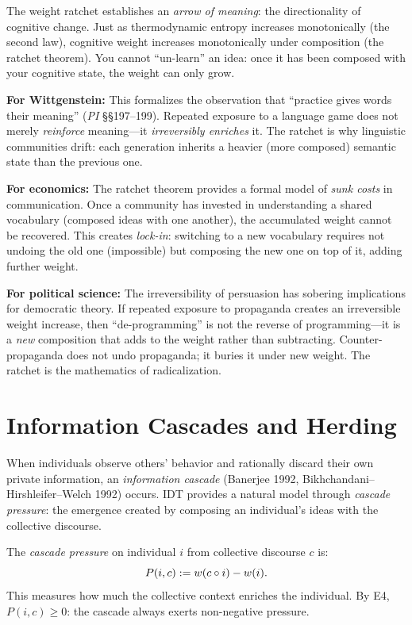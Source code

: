 \begin{interpretation}
The weight ratchet establishes an \emph{arrow of meaning}: the
directionality of cognitive change. Just as thermodynamic entropy
increases monotonically (the second law), cognitive weight increases
monotonically under composition (the ratchet theorem). You cannot
``un-learn'' an idea: once it has been composed with your cognitive
state, the weight can only grow.

\textbf{For Wittgenstein:} This formalizes the observation that ``practice
gives words their meaning'' (\emph{PI} \S\S197--199). Repeated exposure
to a language game does not merely \emph{reinforce} meaning---it
\emph{irreversibly enriches} it. The ratchet is why linguistic communities
drift: each generation inherits a heavier (more composed) semantic state
than the previous one.

\textbf{For economics:} The ratchet theorem provides a formal model of
\emph{sunk costs} in communication. Once a community has invested in
understanding a shared vocabulary (composed ideas with one another), the
accumulated weight cannot be recovered. This creates \emph{lock-in}:
switching to a new vocabulary requires not undoing the old one (impossible)
but composing the new one on top of it, adding further weight.

\textbf{For political science:} The irreversibility of persuasion has
sobering implications for democratic theory. If repeated exposure to
propaganda creates an irreversible weight increase, then ``de-programming''
is not the reverse of programming---it is a \emph{new} composition that
adds to the weight rather than subtracting. Counter-propaganda does not
undo propaganda; it buries it under new weight. The ratchet is the
mathematics of radicalization.
\end{interpretation}


\section{Information Cascades and Herding}

When individuals observe others' behavior and rationally discard their
own private information, an \emph{information cascade} (Banerjee 1992,
Bikhchandani--Hirshleifer--Welch 1992) occurs. IDT provides a natural
model through \emph{cascade pressure}: the emergence created by composing
an individual's ideas with the collective discourse.

\begin{definition}
\label{def:cascade-pressure}
The \emph{cascade pressure} on individual $i$ from collective discourse $c$
is:
\[
P(i, c) := w(c \circ i) - w(i).
\]
This measures how much the collective context enriches the individual.
By E4, $P(i, c) \geq 0$: the cascade always exerts non-negative pressure.
\end{definition}

